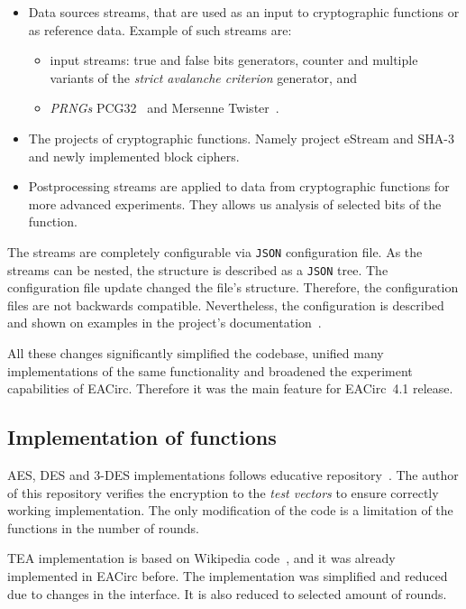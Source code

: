 \documentclass[
    digital,    %
    oneside,    %
    color,
    11pt,
    nocover,
    notable,
    nolof,
    nolot,
]{fithesis3}
\begin{document}
\begin{itemize}
    \item Data sources streams, that are used as an input to cryptographic functions or as reference data. Example of such streams are:
    \begin{itemize}
        \item input streams: true and false bits generators, counter and multiple variants of the \textit{strict avalanche criterion} generator, and
        \item \textit{PRNGs} PCG32~\cite{pcgGen} and Mersenne Twister~\cite{matsumoto1998mersenne}.
    \end{itemize}
    \item The projects of cryptographic functions. Namely project eStream and SHA-3 and newly implemented block ciphers.
    \item Postprocessing streams are applied to data from cryptographic functions for more advanced experiments. They allows us analysis of selected bits of the function.
\end{itemize}

The streams are completely configurable via \texttt{JSON} configuration file. As the streams can be nested, the structure is described as a \texttt{JSON} tree. The configuration file update changed the file's structure. Therefore, the configuration files are not backwards compatible. Nevertheless, the configuration is described and shown on examples in the project's documentation~\cite{EACirc-wiki-streams}.

All these changes significantly simplified the codebase, unified many implementations of the same functionality and broadened the experiment capabilities of EACirc. Therefore it was the main feature for EACirc~4.1 release.

\subsection{Implementation of functions}
\label{subsec:method-data-funcs}

AES, DES and 3-DES implementations follows educative repository~\cite{cryptoFunc}. The author of this repository verifies the encryption to the \textit{test vectors} to ensure correctly working implementation. The only modification of the code is a limitation of the functions in the number of rounds.

TEA implementation is based on Wikipedia code~\cite{teaWiki}, and it was already implemented in EACirc before. The implementation was simplified and reduced due to changes in the interface. It is also reduced to selected amount of rounds.
\end{document}
